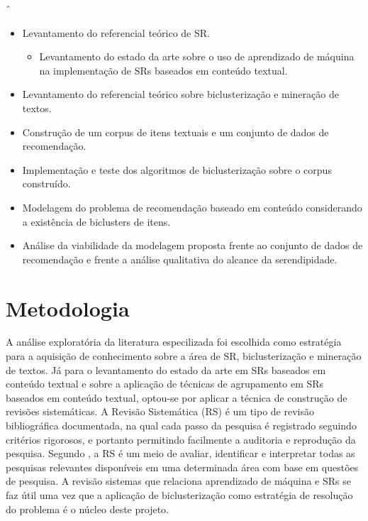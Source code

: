 \documentclass[normaltoc, espacoumemeio, pnumromarab,ruledheader]{abnt}
\begin{document}
ˆ%

\begin{itemize}
 \item Levantamento do referencial teórico de SR.
 \begin{itemize}
  \item Levantamento do estado da arte sobre o uso de aprendizado de máquina na implementação de SRs baseados em conteúdo textual.
 \end{itemize}
 \item Levantamento do referencial teórico sobre biclusterização e mineração de textos.
 \item Construção de um corpus de itens textuais e um conjunto de dados de recomendação.
 \item Implementação e teste dos algoritmos de biclusterização sobre o corpus construído.
 \item Modelagem do problema de recomendação baseado em conteúdo considerando a existência de biclusters de itens.
 \item Análise da viabilidade da modelagem proposta frente ao conjunto de dados de recomendação e frente a análise qualitativa do alcance da serendipidade.
\end{itemize}

\section{Metodologia}



A análise exploratória da literatura especilizada foi escolhida como estratégia para a  aquisição de conhecimento sobre a área de SR, biclusterização e mineração de textos. Já para o levantamento do estado da arte em SRs baseados em conteúdo textual e sobre a aplicação de técnicas de agrupamento em SRs baseados em conteúdo textual, optou-se por aplicar a técnica de construção de revisões sistemáticas. A Revisão Sistemática (RS) é um tipo de revisão bibliográfica documentada, na qual cada passo da pesquisa é registrado seguindo critérios rigorosos, e portanto permitindo facilmente a auditoria e reprodução da pesquisa. Segundo , a RS é um meio de avaliar, identificar e interpretar todas as pesquisas relevantes disponíveis em uma determinada área com base em questões de pesquisa. A revisão sistemas que relaciona aprendizado de máquina e SRs se faz útil uma vez que a aplicação de biclusterização como estratégia de resolução do problema é o núcleo deste projeto.
\end{document}
